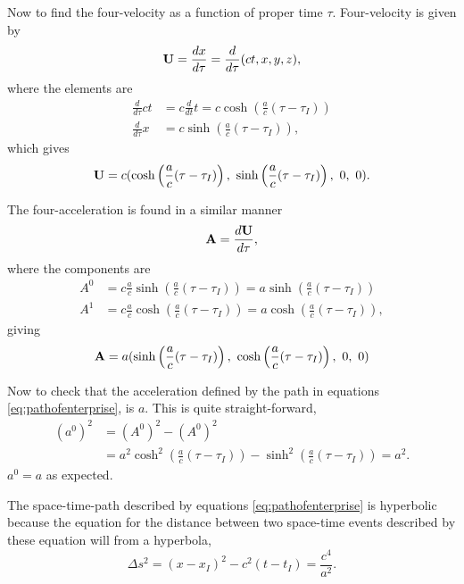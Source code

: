 \documentclass[11pt]{amsart}
\begin{document}
Now to find the four-velocity as a function of proper time $\tau$. Four-velocity is given by
\begin{equation}
\vb{U} = \frac{dx}{d\tau} = \frac{d}{d\tau}(ct, x, y ,z),
\end{equation}
where the elements are 
\begin{align*}
\frac{d}{d\tau}ct &= c\frac{d}{dt}t = c\cosh\left(\frac{a}{c}(\tau - \tau_I) \right) \\
\frac{d}{d\tau} x &= c\sinh\left(\frac{a}{c}(\tau - \tau_I) \right),
\end{align*}
which gives 
\begin{equation}
\vb{U} = c(\cosh\left(\frac{a}{c}(\tau - \tau_I) \right),\ \sinh\left(\frac{a}{c}(\tau - \tau_I) \right),\ 0,\ 0).
\end{equation}

The four-acceleration is found in a similar manner
\begin{equation}
\vb{A} = \frac{d\vb{U}}{d\tau},
\end{equation}
where the components are
\begin{align*}
A^0 &= c\frac{a}{c}\sinh\left(\frac{a}{c}(\tau - \tau_I) \right) = a\sinh\left(\frac{a}{c}(\tau - \tau_I) \right) \\
A^1 &= c\frac{a}{c}\cosh\left(\frac{a}{c}(\tau - \tau_I) \right) = a\cosh\left(\frac{a}{c}(\tau - \tau_I) \right),
\end{align*}
giving
\begin{equation}
\vb{A} = a(\sinh\left(\frac{a}{c}(\tau - \tau_I) \right),\ \cosh\left(\frac{a}{c}(\tau - \tau_I) \right),\ 0,\ 0)
\end{equation}

Now to check that the acceleration defined by the path in equations \ref{eq:pathofenterprise}, is $a$. This is quite straight-forward,
\begin{align*}
(a^0)^2 &= (A^0)^2 - (A^0)^2 \\
		&= a^2\cosh^2\left(\frac{a}{c}(\tau - \tau_I) \right) - \sinh^2\left(\frac{a}{c}(\tau - \tau_I) \right) = a^2.
\end{align*}
$a^0=a$ as expected.

The space-time-path described by equations \ref{eq:pathofenterprise} is hyperbolic because the equation for the distance between two space-time events described by these equation will from a hyperbola,
\begin{equation}
\Delta s^2 = (x-x_I)^2 - c^2(t-t_I) = \frac{c^4}{a^2}.
\end{equation}
\end{document}

